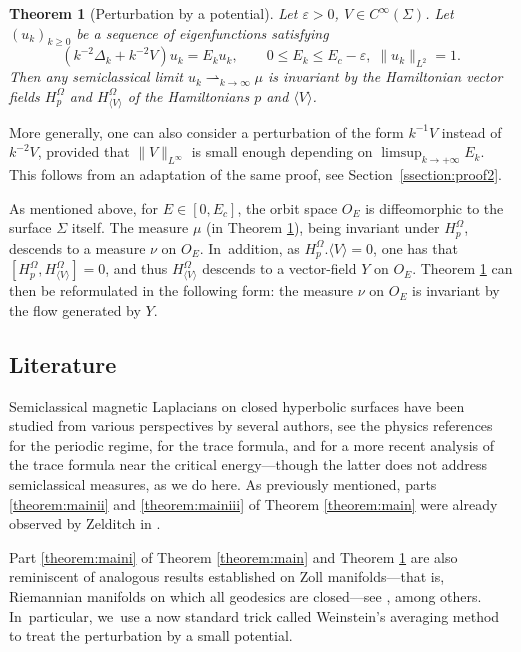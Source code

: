 \documentclass[10pt]{amsart}
\theoremstyle{plain}
\newtheorem{theorem}{Theorem}[section]
\theoremstyle{definition}
\let\eps\varepsilon
\begin{document}
\begin{theorem}[Perturbation by a potential]
\label{theorem:constant2}
Let $\eps > 0$, $V \in C^\infty(\Sigma)$. Let $(u_k)_{k \geq 0}$ be a sequence of eigenfunctions satisfying
\[
(k^{-2}\Delta_k + k^{-2}V) u_k = E_k u_k, \qquad 0 \leq E_k \leq E_c-\eps,\; \|u_k\|_{L^2}=1.
\]
Then any semiclassical limit $u_k \rightharpoonup_{k \to \infty} \mu$ is invariant by the Hamiltonian vector fields $H_p^\Omega$ and $H_{\langle V\rangle}^\Omega$ of the Hamiltonians $p$ and $\langle V\rangle$.
\end{theorem}

More generally, one can also consider a perturbation of the form $k^{-1}V$ instead of $k^{-2}V$, provided that $\|V\|_{L^\infty}$ is small enough depending on $\limsup_{k \to +\infty} E_k$. This follows from an adaptation of the same proof, see Section~\ref{ssection:proof2}.

As mentioned above, for $E \in [0, E_c]$, the orbit space $O_E$ is
diffeomorphic to the surface $\Sigma$ itself. The measure $\mu$ (in Theorem
\ref{theorem:constant2}), being invariant under $H_p^{\Omega}$, descends to a
measure $\nu$ on $O_E$. In~addition, as $H_p^{\Omega}. \langle V \rangle = 0$, one has that $[H_p^{\Omega},H_{\langle V \rangle}^\Omega]=0$, and thus $H_{\langle V \rangle}^\Omega$ descends to a vector-field $Y$ on $O_E$. Theorem \ref{theorem:constant2} can then be reformulated in the following form: the measure $\nu$ on $O_E$ is invariant by the flow generated by $Y$.

\subsection{Literature}

\label{ssection:literature}

Semiclassical magnetic Laplacians on closed hyperbolic surfaces have been studied from
various perspectives by several authors, see the physics references \cite{Comtet-86,Iengo-Li-94} for the periodic regime, \cite{Guillemin-Uribe-89} for
the trace formula, and \cite{Kordyukov-Taimanov-22} for a more recent analysis of the trace formula near the critical energy—though the latter does not address semiclassical measures, as we do here. As previously mentioned, parts \eqref{theorem:mainii} and \eqref{theorem:mainiii} of Theorem \ref{theorem:main} were already observed by Zelditch in \cite{Zelditch-92}.

Part \eqref{theorem:maini} of Theorem \ref{theorem:main} and Theorem \ref{theorem:constant2} are also reminiscent of analogous results established on Zoll manifolds—that is, Riemannian manifolds on which all geodesics are closed—see \cite{ColinDeVerdiere-79, Uribe-Zelditch-93, Zelditch-97,Macia-08,Macia-09,Zelditch-15, Macia-Riviere-16,Arnaiz-Macia-22,Arnaiz-Macia-22-2}, among others. In~particular, we~use a now standard trick called Weinstein's averaging method \cite{Weinstein-77} to treat the perturbation by a small potential.
\end{document}
